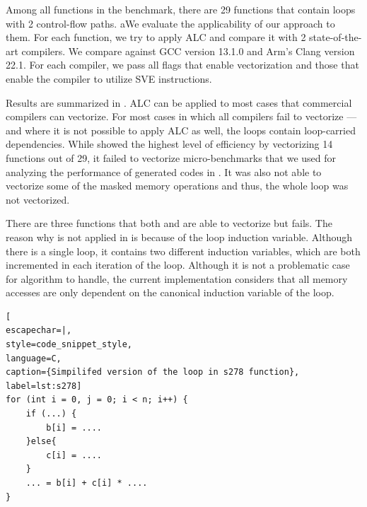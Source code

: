 Among all functions in the benchmark, there are 29 functions that contain loops with 2 control-flow paths. aWe evaluate the applicability of our approach to them. For each function, we try to apply ALC and compare it with 2 state-of-the-art compilers. We compare against GCC version 13.1.0 and Arm's Clang version 22.1. For each compiler, we pass all flags that enable vectorization and those that enable the compiler to utilize SVE instructions. 

Results are summarized in . ALC can be applied to most cases that commercial compilers can vectorize. For most cases in which all compilers fail to vectorize --- and where it is not possible to apply ALC as well, the loops contain loop-carried dependencies. While \gcc showed the highest level of efficiency by vectorizing 14 functions out of 29, it failed to vectorize micro-benchmarks that we used for analyzing the performance of generated codes in . It was also not able to vectorize some of the masked memory operations and thus, the whole loop was not vectorized.

There are three functions that both \gcc and \armclang are able to vectorize but \ALC fails. The reason why \ALC is not applied in  is because of the loop induction variable. Although there is a single loop, it contains two different induction variables, which are both incremented in each iteration of the loop. Although it is not a problematic case for \ALC algorithm to handle, the current implementation considers that all memory accesses are only dependent on the canonical induction variable of the loop.




\begin{center}
\begin{minipage}[t]{0.99\columnwidth}
\begin{lstlisting}[
escapechar=|,
style=code_snippet_style,
language=C,
caption={Simpilifed version of the loop in s278 function},
label=lst:s278]
for (int i = 0, j = 0; i < n; i++) {
    if (...) { 
        b[i] = ....
    }else{
        c[i] = ....
    }
    ... = b[i] + c[i] * ....
}
\end{lstlisting} 
\end{minipage}
\end{center}


